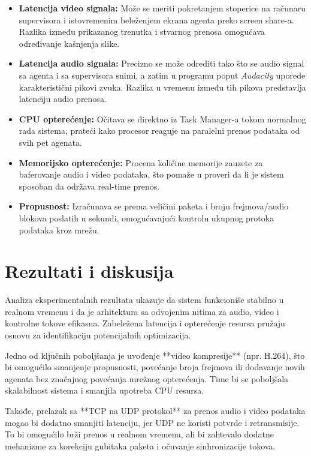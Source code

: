 \documentclass[a4paper,12pt]{article}
\begin{document}
\begin{itemize}
    \item \textbf{Latencija video signala:} Može se meriti pokretanjem stoperice na računaru supervisora i istovremenim beleženjem ekrana agenta preko screen share-a. Razlika između prikazanog trenutka i stvarnog prenosa omogućava određivanje kašnjenja slike.
    
    \item \textbf{Latencija audio signala:} Precizno se može odrediti tako što se audio signal sa agenta i sa supervisora snimi, a zatim u programu poput \textit{Audacity} uporede karakteristični pikovi zvuka. Razlika u vremenu između tih pikova predstavlja latenciju audio prenosa.
    
    \item \textbf{CPU opterećenje:} Očitava se direktno iz Task Manager-a tokom normalnog rada sistema, prateći kako procesor reaguje na paralelni prenos podataka od svih pet agenata.
    
    \item \textbf{Memorijsko opterećenje:} Procena količine memorije zauzete za baferovanje audio i video podataka, što pomaže u proveri da li je sistem sposoban da održava real-time prenos.
    
    \item \textbf{Propusnost:} Izračunava se prema veličini paketa i broju frejmova/audio blokova poslatih u sekundi, omogućavajući kontrolu ukupnog protoka podataka kroz mrežu.
\end{itemize}

\section{Rezultati i diskusija}

Analiza eksperimentalnih rezultata ukazuje da sistem funkcioniše stabilno u realnom vremenu i da je arhitektura sa odvojenim nitima za audio, video i kontrolne tokove efikasna. Zabeležena latencija i opterećenje resursa pružaju osnovu za identifikaciju potencijalnih optimizacija.

Jedno od ključnih poboljšanja je uvođenje **video kompresije** (npr. H.264), što bi omogućilo smanjenje propusnosti, povećanje broja frejmova ili dodavanje novih agenata bez značajnog povećanja mrežnog opterećenja. Time bi se poboljšala skalabilnost sistema i smanjila upotreba CPU resursa.

Takođe, prelazak sa **TCP na UDP protokol** za prenos audio i video podataka mogao bi dodatno smanjiti latenciju, jer UDP ne koristi potvrde i retransmisije. To bi omogućilo brži prenos u realnom vremenu, ali bi zahtevalo dodatne mehanizme za korekciju gubitaka paketa i očuvanje sinhronizacije tokova.
\end{document}
